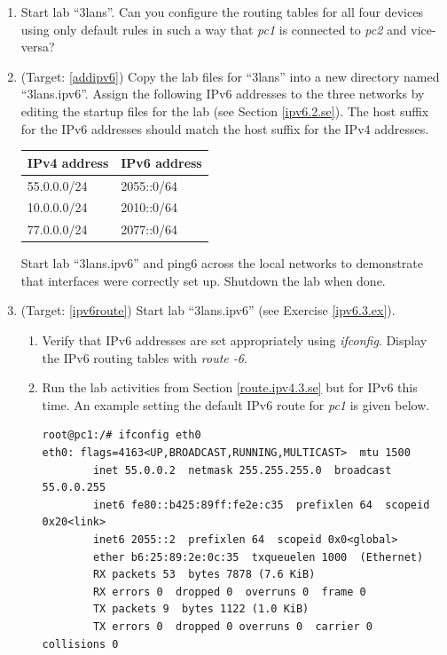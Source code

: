 \documentclass[12pt]{book}
\begin{document}
\begin{enumerate}
\item Start lab ``3lans''. Can you configure the routing tables for all four devices  using only default rules in such a way that \emph{pc1} is connected to \emph{pc2} and vice-versa?

\item\label{ipv6.3.ex} (Target: \ref{addipv6}) Copy the lab files for ``3lans'' into a new directory named ``3lans.ipv6''. Assign the following IPv6 addresses to the three networks by editing the startup files for the lab (see Section \ref{ipv6.2.se}). The host suffix for the IPv6 addresses should match the host suffix for the IPv4 addresses.

  \begin{tabular}{l l} \toprule
    IPv4 address  & IPv6 address \\ \midrule
    55.0.0.0/24 & 2055::0/64 \\
    10.0.0.0/24 & 2010::0/64 \\
    77.0.0.0/24 & 2077::0/64\\ \bottomrule
  \end{tabular}

  Start lab ``3lans.ipv6'' and ping6 across the local networks to demonstrate that interfaces were correctly set up. Shutdown the lab when done.

\item (Target: \ref{ipv6route}) Start lab ``3lans.ipv6'' (see Exercise \ref{ipv6.3.ex}).
  \begin{enumerate}[label=(\alph*)]
  \item Verify that IPv6 addresses are set appropriately using \emph{ifconfig}. Display the IPv6 routing tables with \emph{route -6}.
  \item Run the lab activities from Section \ref{route.ipv4.3.se} but for IPv6 this time. An example setting the default IPv6 route for \emph{pc1} is given below.
    \begin{lstlisting}
root@pc1:/# ifconfig eth0
eth0: flags=4163<UP,BROADCAST,RUNNING,MULTICAST>  mtu 1500
        inet 55.0.0.2  netmask 255.255.255.0  broadcast 55.0.0.255
        inet6 fe80::b425:89ff:fe2e:c35  prefixlen 64  scopeid 0x20<link>
        inet6 2055::2  prefixlen 64  scopeid 0x0<global>
        ether b6:25:89:2e:0c:35  txqueuelen 1000  (Ethernet)
        RX packets 53  bytes 7878 (7.6 KiB)
        RX errors 0  dropped 0  overruns 0  frame 0
        TX packets 9  bytes 1122 (1.0 KiB)
        TX errors 0  dropped 0 overruns 0  carrier 0  collisions 0


\end{lstlisting}
\end{enumerate}
\end{enumerate}
\end{document}
